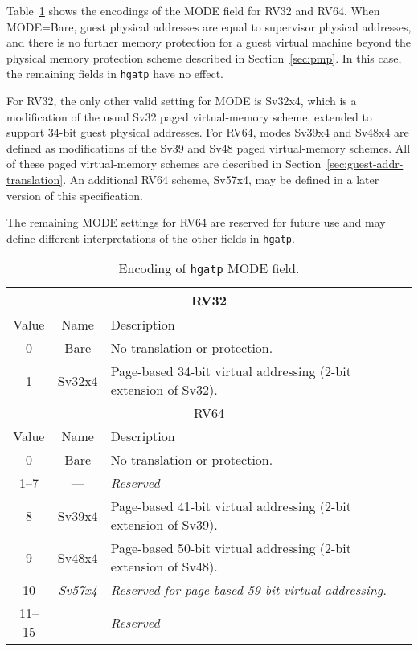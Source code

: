 Table~\ref{tab:hgatp-mode} shows the encodings of the MODE field for RV32 and
RV64.
When MODE=Bare, guest physical addresses are equal to supervisor physical
addresses, and there is no further memory protection for a guest virtual
machine beyond the physical memory protection scheme described in
Section~\ref{sec:pmp}.
In this case, the remaining fields in {\tt hgatp} have no effect.

For RV32, the only other valid setting for MODE is Sv32x4, which is a
modification of the usual Sv32 paged virtual-memory scheme, extended to support
34-bit guest physical addresses.
For RV64, modes Sv39x4 and Sv48x4 are defined as modifications of the Sv39 and
Sv48 paged virtual-memory schemes.
All of these paged virtual-memory schemes are described in
Section~\ref{sec:guest-addr-translation}.
An additional RV64 scheme, Sv57x4, may be defined in a later version of this
specification.

The remaining MODE settings for RV64 are reserved for future use and may define
different interpretations of the other fields in {\tt hgatp}.

\begin{table}[h]
\begin{center}
\begin{tabular}{|c|c|l|}
\hline
\multicolumn{3}{|c|}{RV32} \\
\hline
Value  & Name & Description \\
\hline
0      & Bare   & No translation or protection. \\
1      & Sv32x4 & Page-based 34-bit virtual addressing (2-bit extension of Sv32). \\
\hline \hline
\multicolumn{3}{|c|}{RV64} \\
\hline
Value  & Name & Description \\
\hline
0      & Bare   & No translation or protection. \\
1--7   & ---    & {\em Reserved} \\
8      & Sv39x4 & Page-based 41-bit virtual addressing (2-bit extension of Sv39). \\
9      & Sv48x4 & Page-based 50-bit virtual addressing (2-bit extension of Sv48). \\
10     & {\em Sv57x4} & {\em Reserved for page-based 59-bit virtual addressing.} \\
11--15 & ---    & {\em Reserved} \\
\hline
\end{tabular}
\end{center}
\caption{Encoding of {\tt hgatp} MODE field.}
\label{tab:hgatp-mode}
\end{table}


